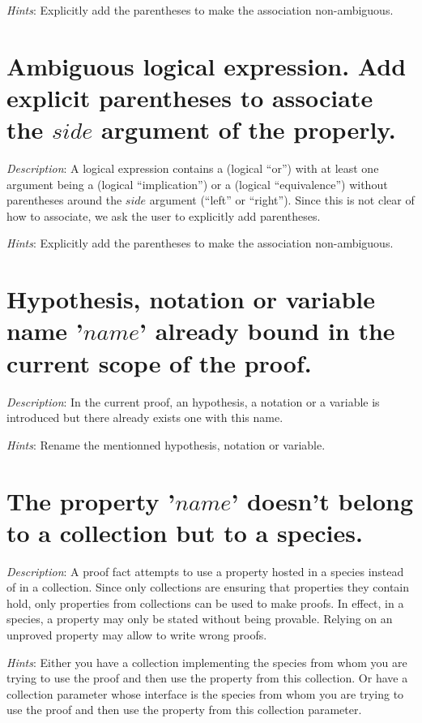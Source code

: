 {\em Hints}: Explicitly add the parentheses to make the association
non-ambiguous.



\section*{Ambiguous logical expression. Add explicit parentheses to
  associate the $side$ argument of the \terminal{\backslash/} properly.}
{\em Description}: A logical expression contains a
\terminal{\backslash/} (logical ``or'') with at least one argument being a
\terminal{->} (logical ``implication'') or a \terminal{<->} (logical
``equivalence'') without parentheses around the $side$ argument (``left''
or ``right''). Since this is not clear of how to associate, we  ask
the user to explicitly add parentheses.

{\em Hints}: Explicitly add the parentheses to make the association
non-ambiguous.



\section*{Hypothesis, notation or variable name '$name$' already bound in
  the current scope of the proof.}
{\em Description}: In the current proof, an hypothesis, a notation or a
variable is introduced but there already exists one with this name.

{\em Hints}: Rename the mentionned hypothesis, notation or variable.


\section*{The property '$name$' doesn't belong to a collection but to a
  species.}
{\em Description}: A proof fact attempts to use a property hosted in a species
instead of in a collection. Since only collections are ensuring that properties
they contain hold, only properties from collections can be used to make
proofs. In effect, in a species, a property may only be stated without being
provable. Relying on an unproved property may allow to write wrong proofs.

{\em Hints}: Either you have a collection implementing the species from whom
you are trying to use the proof and then use the property from this collection.
Or have a collection parameter whose interface is the species from whom you
are trying to use the proof and then use the property from this collection
parameter.



